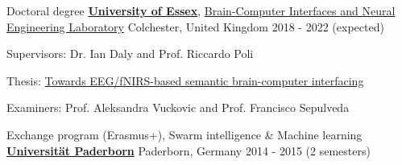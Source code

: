 

\begin{cventries}

  \cventry
    {Doctoral degree} %
    {\href{https://www.essex.ac.uk}{\textbf{University of Essex}}, \href{http://essexbcis.uk}{Brain-Computer Interfaces and Neural Engineering Laboratory}} %
    {Colchester, United Kingdom} %
    {2018 - 2022 (expected)} %
    {
      \begin{cvitems} %
        \item {Supervisors: Dr. Ian Daly and Prof. Riccardo Poli}
        \item {Thesis: \href{http://milanrybar.cz/semantic-brain-computer-interfacing}{Towards EEG/fNIRS-based semantic brain-computer interfacing}}
        \item {Examiners: Prof. Aleksandra Vuckovic and Prof. Francisco Sepulveda}
      \end{cvitems}
    }

  \cventry
{Exchange program (Erasmus+), Swarm intelligence \& Machine learning} %
{\href{http://www.uni-paderborn.de}{\textbf{Universität Paderborn}}} %
{Paderborn, Germany} %
{2014 - 2015 (2 semesters)} %
{
}


\end{cventries}
